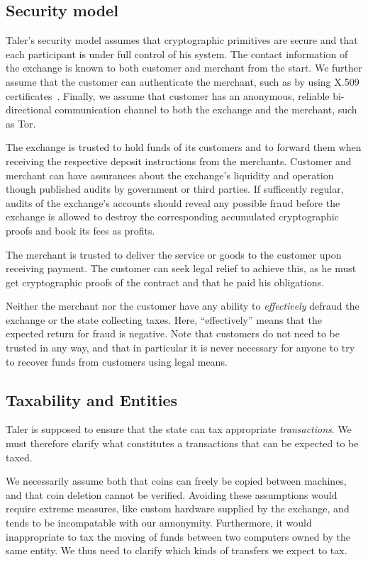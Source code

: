 \documentclass{llncs}
\begin{document}
\subsection{Security model}

Taler's security model assumes that cryptographic primitives are
secure and that each participant is under full control of his system.
The contact information of the exchange is known to both customer and
merchant from the start.  
We further assume that the customer can authenticate the merchant,
such as by using X.509 certificates~\cite{rfc5280}. %
Finally, we assume that customer has an anonymous, reliable bi-directional
communication channel to both the exchange and the merchant, such as Tor.

The exchange is trusted to hold funds of its customers and to forward them
when receiving the respective deposit instructions from the merchants.
Customer and merchant can have assurances about the exchange's liquidity
and operation though published audits by government or third parties.
If sufficently regular, audits of the exchange's accounts should reveal any
possible fraud before the exchange is allowed to destroy the corresponding
accumulated cryptographic proofs and book its fees as profits.

The merchant is trusted to deliver the service or goods to the
customer upon receiving payment.  The customer can seek legal relief
to achieve this, as he must get cryptographic proofs of the contract
and that he paid his obligations.

Neither the merchant nor the customer have any ability to {\em effectively}
defraud the exchange or the state collecting taxes.  Here, ``effectively''
means that the expected return for fraud is negative.
%
Note that customers do not need to be trusted in any way, and that in
particular it is never necessary for anyone to try to recover funds
from customers using legal means.

\subsection{Taxability and Entities}

Taler is supposed to ensure that the state can tax appropriate
{\em transactions}.  We must therefore clarify what constitutes a
transactions that can be expected to be taxed.

We necessarily assume both that coins can freely be copied between 
machines, and that coin deletion cannot be verified.
Avoiding these assumptions would require extreme measures, like custom
hardware supplied by the exchange, and tends to be incompatable with
our annonymity.  Furthermore, it would inappropriate to tax the moving
of funds between two computers owned by the same entity.  We thus
need to clarify which kinds of transfers we expect to tax.
\end{document}
